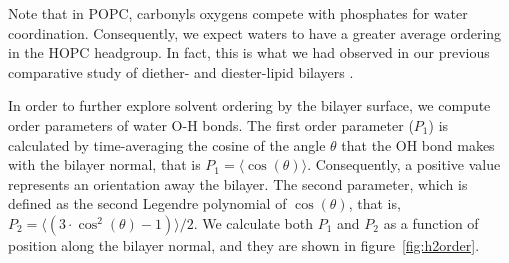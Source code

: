 \documentclass[12pt,preprint,times,openany,draft]{book}
\begin{document}
Note that in POPC, carbonyls oxygens compete with phosphates for water coordination. Consequently, we expect waters 
to have a greater average ordering in the HOPC headgroup. In fact, this is what we had observed in our previous comparative study of 
diether- and diester-lipid bilayers \cite{kruczek:2017:ether}. 

In order to further explore solvent ordering by the bilayer surface, we compute order parameters of water O-H bonds. 
The first order parameter ($P_1$) is calculated by time-averaging the cosine of 
the angle $\theta$ that the OH bond makes with the bilayer normal, 
that is $P_1 = \langle \cos(\theta) \rangle$. Consequently, a positive value represents an orientation 
away the bilayer. The second parameter, which is defined as the second Legendre polynomial of $\cos(\theta)$, that 
is, $P_2 = \langle (3 \cdot \cos^{2}(\theta)-1) \rangle/2$.  
We calculate both $P_1$ and $P_2$ as a function of position along the bilayer normal, and they are shown in figure~\ref{fig:h2order}. 
\end{document}

